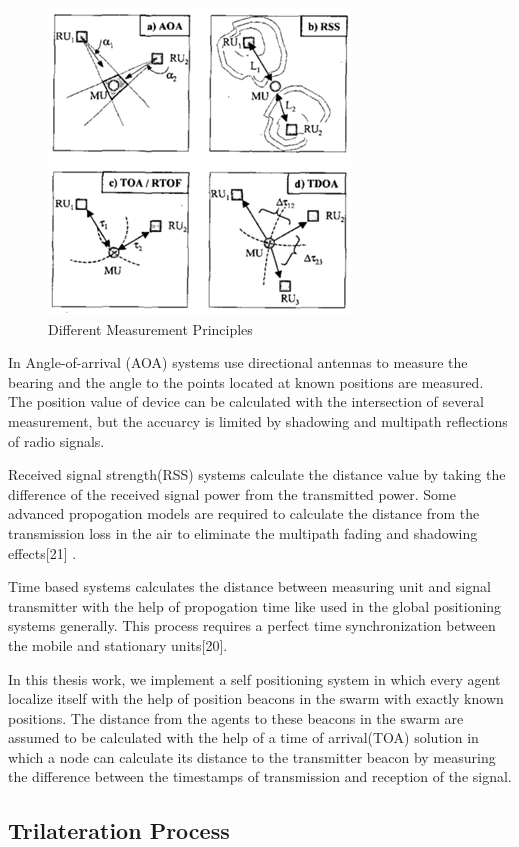 \begin{figure}[H]
	\caption{Different Measurement Principles}
	\centering
	\includegraphics[scale = 1]{measurement}
\end{figure} 

In Angle-of-arrival (AOA) systems use directional antennas to measure the bearing and the angle to the points located at known positions are measured. The position value of device can be calculated with the intersection of several measurement, but the accuarcy is limited by shadowing and multipath reflections of radio signals. 

Received signal strength(RSS) systems calculate the distance value by taking the difference of the received signal power from the transmitted power. Some advanced propogation models are required to calculate the distance from the transmission loss in the air to eliminate the multipath fading and shadowing effects[21] . 

Time based systems calculates the distance between measuring unit and signal transmitter with the help of propogation time like used in the global positioning systems generally. This process requires a perfect time synchronization between the mobile and stationary units[20].

In this thesis work, we implement a self positioning system in which every agent localize itself with the help of position beacons in the swarm with exactly known positions. The distance from the agents to these beacons in the swarm are assumed to be calculated with the help of a time of arrival(TOA) solution in which a node can calculate its distance to the transmitter beacon by measuring the difference between the timestamps of transmission and reception of the signal. 


\subsection{Trilateration Process} \label{Trilateration_Process_ref}

